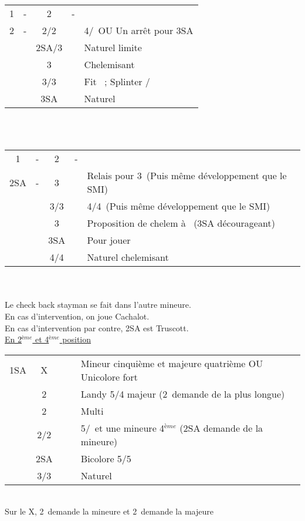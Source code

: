 \documentclass[a4paper, oneside, 11pt]{report}
\begin{document}
		\begin{tabular}{cccc|l}
		1\carreau & - & 2\trefle & - &\\
		2\carreau & - & 2\coeur/2\pique && 4\coeur/\pique\ OU Un arrêt pour 3SA\\
		&& 2SA/3\trefle && Naturel limite\\
		&& 3\carreau && Chelemisant \carreau\\
		&& 3\coeur/3\pique && Fit \carreau\ ; Splinter \coeur/\pique\\
		&& 3SA && Naturel\\
		\end{tabular}\\\\

		\begin{tabular}{cccc|l}
		1\carreau & - & 2\trefle & - &\\
		2SA & - & 3\trefle && Relais pour 3\carreau\ (Puis même développement que le SMI)\\
		&& 3\carreau/3\coeur && 4\coeur/4\pique\ (Puis même développement que le SMI)\\
		&& 3\pique && Proposition de chelem à \trefle\ (3SA décourageant)\\
		&& 3SA && Pour jouer\\
		&& 4\trefle/4\carreau && Naturel chelemisant\\
		\end{tabular}\\\\

		Le check back stayman se fait dans l'autre mineure.\\
		
		En cas d'intervention, on joue Cachalot.\\

		En cas d'intervention par contre, 2SA est Truscott.\\

	\underline{En 2$^{ème}$ et 4$^{ème}$ position}
	
	\begin{tabular}{cccc|l}
	1SA & X &&& Mineur cinquième et majeure quatrième OU Unicolore fort\\
	& 2\trefle &&& Landy 5/4 majeur (2\carreau\ demande de la plus longue)\\
	& 2\carreau &&& Multi\\
	& 2\coeur/2\pique &&& 5\coeur/\pique\ et une mineure 4$^{ème}$ (2SA demande de la mineure)\\
	& 2SA &&& Bicolore 5\trefle/5\carreau\\
	& 3\trefle/3\carreau &&& Naturel\\
	\end{tabular}\\
	Sur le X, 2\trefle\ demande la mineure et 2\carreau\ demande la majeure\\
\end{document}
